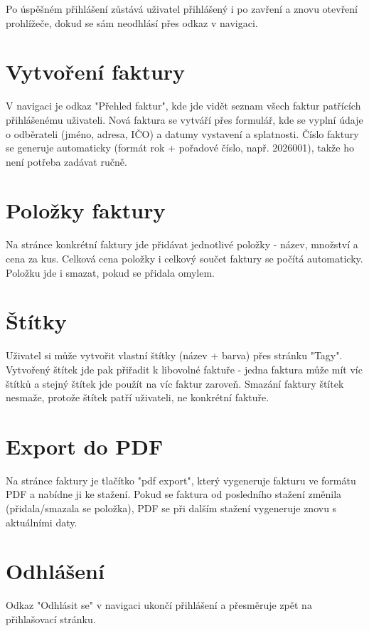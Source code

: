 \documentclass[a4paper,12pt]{article}
\begin{document}
Po úspěšném přihlášení zůstává uživatel přihlášený i po zavření a znovu
otevření prohlížeče, dokud se sám neodhlásí přes odkaz v navigaci.

\section{Vytvoření faktury}
V navigaci je odkaz "Přehled faktur", kde jde vidět seznam všech faktur
patřících přihlášenému uživateli. Nová faktura se vytváří přes formulář, kde
se vyplní údaje o odběrateli (jméno, adresa, IČO) a datumy vystavení a
splatnosti. Číslo faktury se generuje automaticky (formát rok + pořadové
číslo, např. 2026001), takže ho není potřeba zadávat ručně.

\section{Položky faktury}
Na stránce konkrétní faktury jde přidávat jednotlivé položky - název,
množství a cena za kus. Celková cena položky i celkový součet faktury se
počítá automaticky. Položku jde i smazat, pokud se přidala omylem.

\section{Štítky}
Uživatel si může vytvořit vlastní štítky (název + barva) přes stránku
"Tagy". Vytvořený štítek jde pak přiřadit k libovolné faktuře - jedna
faktura může mít víc štítků a stejný štítek jde použít na víc faktur
zaroveň. Smazání faktury štítek nesmaže, protože štítek patří uživateli, ne
konkrétní faktuře.

\section{Export do PDF}
Na stránce faktury je tlačítko "pdf export", který vygeneruje fakturu ve
formátu PDF a nabídne ji ke stažení. Pokud se faktura od posledního stažení
změnila (přidala/smazala se položka), PDF se při dalším stažení vygeneruje
znovu s aktuálními daty.

\section{Odhlášení}
Odkaz "Odhlásit se" v navigaci ukončí přihlášení a přesměruje zpět na
přihlašovací stránku.
\end{document}
